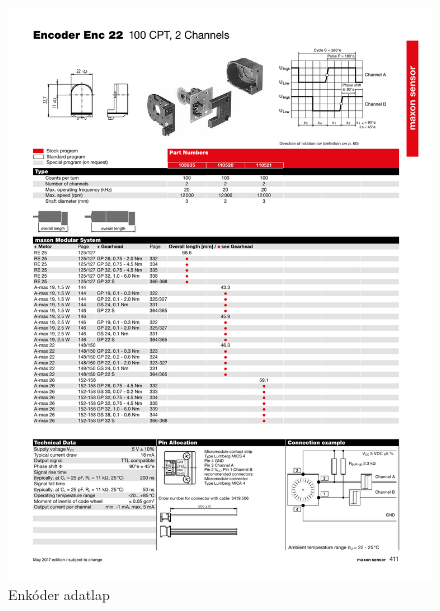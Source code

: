 \begin{figure}[H]
    \begin{center}
    \includegraphics[width=\textwidth]{images/encoder.pdf}
    \caption{Enkóder adatlap}\label{fig:encoder_datasheet}
    \end{center}
\end{figure}

